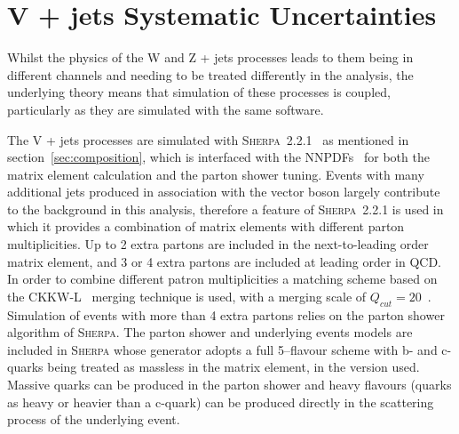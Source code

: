 
\section{V + jets Systematic Uncertainties}
\label{sec:vjets}
Whilst the physics of the W and Z + jets processes leads to them being in
different channels and needing to be treated differently in the analysis, the
underlying theory means that simulation of these processes is coupled,
particularly as they are simulated with the same software.

The V + jets processes are simulated with
\textsc{Sherpa}~2.2.1~\cite{1126-6708-2009-02-007} as mentioned in
section~\ref{sec:composition}, which is interfaced with the
NNPDFs~\cite{Ball:2012cx} for both the matrix element calculation and the parton shower
tuning. Events with many additional jets produced in association with the vector
boson largely contribute to the background in this analysis, therefore a feature
of \textsc{Sherpa}~2.2.1 is used in which it provides a combination of matrix
elements with different parton multiplicities. Up to 2 extra partons are
included in the next-to-leading order matrix element, and 3 or 4 extra partons
are included at leading order in QCD. In order to combine different patron
multiplicities a matching scheme based on the CKKW-L~\cite{Lonnblad:2001iq,
  Lavesson:2005xu} merging technique is used, with a merging scale of $Q_{cut} =
20$~\GeV. Simulation of events with more than 4 extra partons relies on the
parton shower algorithm of \textsc{Sherpa}. The parton shower and underlying
events models are included in \textsc{Sherpa} whose generator adopts a full
5--flavour scheme with b- and c-quarks being treated as massless in the matrix
element, in the version used. Massive quarks can be produced in the parton
shower and heavy flavours (quarks as heavy or heavier than a c-quark) can be
produced directly in the scattering process of the underlying event.

